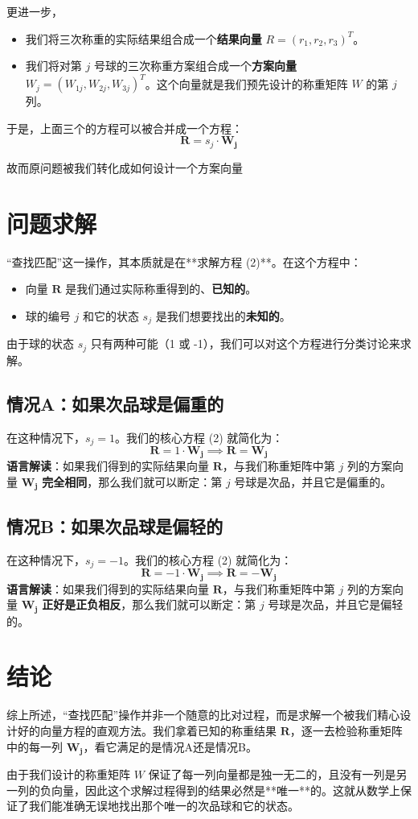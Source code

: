 \documentclass[12pt, a4paper]{ctexart}
\begin{document}
更进一步，
\begin{itemize}
    \item 我们将三次称重的实际结果组合成一个\textbf{结果向量} $R = (r_1, r_2, r_3)^T$。
    \item 我们将对第 $j$ 号球的三次称重方案组合成一个\textbf{方案向量} $W_j = (W_{1j}, W_{2j}, W_{3j})^T$。这个向量就是我们预先设计的称重矩阵 $W$ 的第 $j$ 列。
\end{itemize}
于是，上面三个的方程可以被合并成一个方程：
\begin{equation}
    \mathbf{R} = s_j \cdot \mathbf{W_j}
\end{equation}

故而原问题被我们转化成如何设计一个方案向量
\section{问题求解}

“查找匹配”这一操作，其本质就是在**求解方程 (2)**。在这个方程中：
\begin{itemize}
    \item 向量 $\mathbf{R}$ 是我们通过实际称重得到的、\textbf{已知的}。
    \item 球的编号 $j$ 和它的状态 $s_j$ 是我们想要找出的\textbf{未知的}。
\end{itemize}
由于球的状态 $s_j$ 只有两种可能（1 或 -1），我们可以对这个方程进行分类讨论来求解。

\subsection{情况A：如果次品球是偏重的}
在这种情况下，$s_j = 1$。我们的核心方程 (2) 就简化为：
$$ \mathbf{R} = 1 \cdot \mathbf{W_j} \implies \mathbf{R} = \mathbf{W_j} $$
\textbf{语言解读}：如果我们得到的实际结果向量 $\mathbf{R}$，与我们称重矩阵中第 $j$ 列的方案向量 $\mathbf{W_j}$ \textbf{完全相同}，那么我们就可以断定：第 $j$ 号球是次品，并且它是偏重的。

\subsection{情况B：如果次品球是偏轻的}
在这种情况下，$s_j = -1$。我们的核心方程 (2) 就简化为：
$$ \mathbf{R} = -1 \cdot \mathbf{W_j} \implies \mathbf{R} = -\mathbf{W_j} $$
\textbf{语言解读}：如果我们得到的实际结果向量 $\mathbf{R}$，与我们称重矩阵中第 $j$ 列的方案向量 $\mathbf{W_j}$ \textbf{正好是正负相反}，那么我们就可以断定：第 $j$ 号球是次品，并且它是偏轻的。

\section{结论}
综上所述，“查找匹配”操作并非一个随意的比对过程，而是求解一个被我们精心设计好的向量方程的直观方法。我们拿着已知的称重结果 $\mathbf{R}$，逐一去检验称重矩阵中的每一列 $\mathbf{W_j}$，看它满足的是情况A还是情况B。

由于我们设计的称重矩阵 $W$ 保证了每一列向量都是独一无二的，且没有一列是另一列的负向量，因此这个求解过程得到的结果必然是**唯一**的。这就从数学上保证了我们能准确无误地找出那个唯一的次品球和它的状态。
\end{document}
